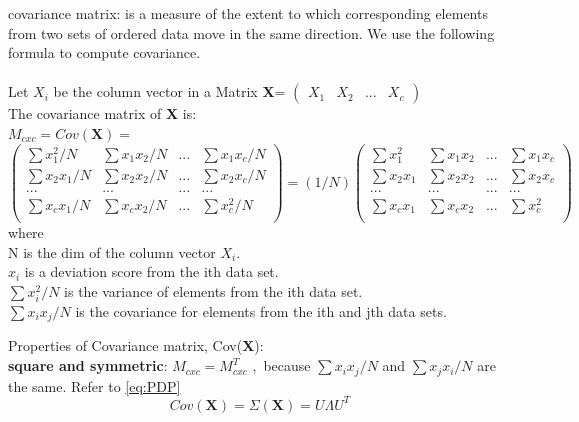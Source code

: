 \documentclass[a4paper,12pt]{article}
\begin{document}
\begin{compactitem}
\item covariance matrix: is a measure of the extent to which corresponding elements from two sets
of ordered data move in the same direction. We use the following formula to compute covariance.
\cite{wiki-covariance}\cite{STAT-covariance}\\
\\Let $X_i$ be the column vector in a Matrix \textbf{X}=
$\begin{pmatrix} X_1 & X_2 &... & X_c \end{pmatrix}$\\
The covariance matrix of \textbf{X} is:\\
$M_{cxc} = Cov(\textbf{X})=$
\begin{equation}
\label{eq:covarm1}
\begin{pmatrix}
       \sum x_1^{2}/N 	& \sum x_1 x_2/N 	& ...	& \sum x_1 x_c/N	\\[0.3em]
       \sum x_2 x_1/N 	& \sum x_2 x_2/N 	& ...	& \sum x_2 x_c/N	\\[0.3em]
       ...		& ...			& ...	&	...		\\[0.3em]
       \sum x_c x_1/N 	& \sum x_c x_2/N 	& ...	& \sum x_c^{2}/N	\\[0.3em]
\end{pmatrix}
=(1/N)
\begin{pmatrix}
       \sum x_1^{2} 	& \sum x_1 x_2 	& ...	& \sum x_1 x_c	\\[0.3em]
       \sum x_2 x_1 	& \sum x_2 x_2 	& ...	& \sum x_2 x_c	\\[0.3em]
       ...		& ...			& ...	&	...		\\[0.3em]
       \sum x_c x_1 	& \sum x_c x_2 	& ...	& \sum x_c^{2}	\\[0.3em]
\end{pmatrix}
\end{equation}
where\\
N is the dim of the column vector $X_i$.\\
$x_i$ is a deviation score from the ith data set.\\
$\sum x_i^2 / N$ is the variance of elements from the ith data set.\\
$\sum x_i x_j / N$ is the covariance for elements from the ith and jth data sets.\\

\item Properties of Covariance matrix, Cov(\textbf{X}):\\
\textbf{square and symmetric}: $M_{cxc}=M_{cxc}^T$ ,\ because $\sum x_i x_j / N$ and $\sum x_j x_i / N$ are the same. Refer to \eqref{eq:PDP}
\begin{equation}
\label{eq:covd}
Cov(\textbf{X}) = \Sigma(\textbf{X}) = U\Lambda U^T
\end{equation}


\end{compactitem}
\end{document}
